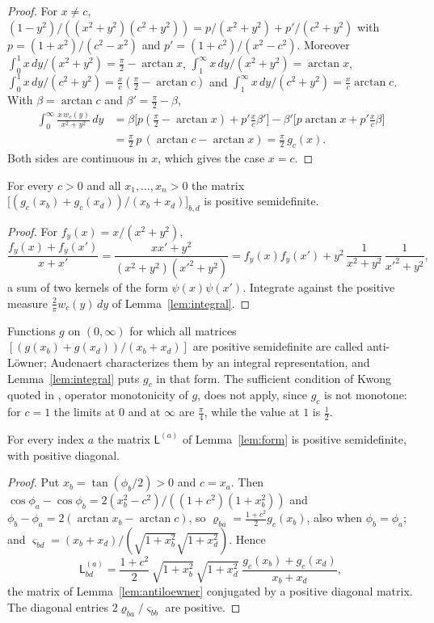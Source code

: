 \begin{proof}
For $x\neq c$,
$(1-y^2)/((x^2+y^2)(c^2+y^2))=p/(x^2+y^2)+p'/(c^2+y^2)$ with
$p=(1+x^2)/(c^2-x^2)$ and $p'=(1+c^2)/(x^2-c^2)$. Moreover
$\int_0^1x\,dy/(x^2+y^2)=\frac\pi2-\arctan x$,
$\int_1^\infty x\,dy/(x^2+y^2)=\arctan x$,
$\int_0^1x\,dy/(c^2+y^2)=\frac xc(\frac\pi2-\arctan c)$ and
$\int_1^\infty x\,dy/(c^2+y^2)=\frac xc\arctan c$. With $\beta=\arctan c$ and
$\beta'=\frac\pi2-\beta$,
\begin{align*}
 \int_0^\infty\frac{x\,w_c(y)}{x^2+y^2}\,dy
 &=\beta\bigl[p(\tfrac\pi2-\arctan x)+p'\tfrac xc\beta'\bigr]
 -\beta'\bigl[p\arctan x+p'\tfrac xc\beta\bigr]\\
 &=\tfrac\pi2\,p\,(\arctan c-\arctan x)=\tfrac\pi2\,g_c(x).
\end{align*}
Both sides are continuous in $x$, which gives the case $x=c$.
\end{proof}

\begin{lemma}\label{lem:antiloewner}
For every $c>0$ and all $x_1,\dots,x_n>0$ the matrix
$\bigl[(g_c(x_b)+g_c(x_d))/(x_b+x_d)\bigr]_{b,d}$ is positive semidefinite.
\end{lemma}

\begin{proof}
For $f_y(x)=x/(x^2+y^2)$,
\[
 \frac{f_y(x)+f_y(x')}{x+x'}=\frac{xx'+y^2}{(x^2+y^2)(x'^2+y^2)}
 =f_y(x)f_y(x')+y^2\,\frac1{x^2+y^2}\,\frac1{x'^2+y^2},
\]
a sum of two kernels of the form $\psi(x)\psi(x')$. Integrate against the
positive measure $\frac2\pi w_c(y)\,dy$ of Lemma~\ref{lem:integral}.
\end{proof}

Functions $g$ on $(0,\infty)$ for which all matrices
$[(g(x_b)+g(x_d))/(x_b+x_d)]$ are positive semidefinite are called
anti-L\"owner; Audenaert \cite{aud11} characterizes them by an integral
representation, and Lemma~\ref{lem:integral} puts $g_c$ in that form. The
sufficient condition of Kwong quoted in \cite{aud11}, operator monotonicity
of $g$, does not apply, since $g_c$ is not monotone: for $c=1$ the limits at
$0$ and at $\infty$ are $\frac\pi4$, while the value at $1$ is $\frac12$.

\begin{lemma}\label{lem:antiloewnermatrix}
For every index $a$ the matrix $\mathsf L^{(a)}$ of Lemma~\ref{lem:form} is
positive semidefinite, with positive diagonal.
\end{lemma}

\begin{proof}
Put $x_b=\tan(\phi_b/2)>0$ and $c=x_a$. Then
$\cos\phi_a-\cos\phi_b=2(x_b^2-c^2)/((1+c^2)(1+x_b^2))$ and
$\phi_b-\phi_a=2(\arctan x_b-\arctan c)$, so
$\varrho_{ba}=\frac{1+c^2}2g_c(x_b)$, also when $\phi_b=\phi_a$; and
$\varsigma_{bd}=(x_b+x_d)/(\sqrt{1+x_b^2}\sqrt{1+x_d^2})$. Hence
\[
 \mathsf L^{(a)}_{bd}=\frac{1+c^2}2\,\sqrt{1+x_b^2}\,\sqrt{1+x_d^2}\;
 \frac{g_c(x_b)+g_c(x_d)}{x_b+x_d},
\]
the matrix of Lemma~\ref{lem:antiloewner} conjugated by a positive diagonal
matrix. The diagonal entries $2\varrho_{ba}/\varsigma_{bb}$ are positive.
\end{proof}

